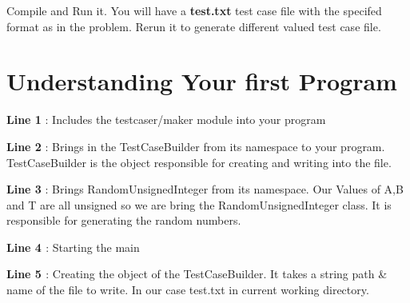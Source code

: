 \begin{DoxyCode}{0}
\DoxyCodeLine{\textcolor{preprocessor}{\#include <testcaser/maker>}}
\DoxyCodeLine{}
\DoxyCodeLine{}
\DoxyCodeLine{}
\DoxyCodeLine{}
\DoxyCodeLine{ \}}
\DoxyCodeLine{\}}
\end{DoxyCode}


Compile and Run it. You will have a {\bfseries{test.\+txt}} test case file with the specifed format as in the problem. Rerun it to generate different valued test case file.\hypertarget{index_under_standing}{}\section{Understanding Your first Program}\label{index_under_standing}
{\bfseries{Line 1}} \+: Includes the testcaser/maker module into your program

{\bfseries{Line 2}} \+: Brings in the Test\+Case\+Builder from its namespace to your program. Test\+Case\+Builder is the object responsible for creating and writing into the file.

{\bfseries{Line 3}} \+: Brings Random\+Unsigned\+Integer from its namespace. Our Values of A,B and T are all unsigned so we are bring the Random\+Unsigned\+Integer class. It is responsible for generating the random numbers.

{\bfseries{Line 4 }} \+: Starting the main

{\bfseries{Line 5 }} \+: Creating the object of the Test\+Case\+Builder. It takes a string path \& name of the file to write. In our case test.\+txt in current working directory. 